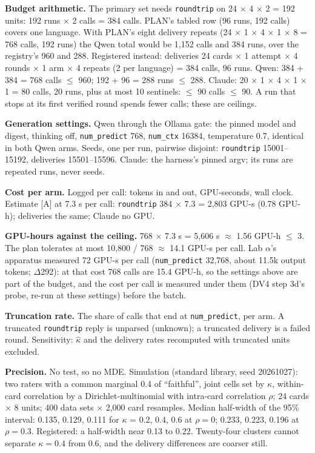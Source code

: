 \documentclass[11pt]{article}
\begin{document}
\begin{answer}
\textbf{Budget arithmetic.} The primary set needs \texttt{roundtrip} on 24
$\times$ 4 $\times$ 2 = 192 units: 192 runs $\times$ 2 calls = 384 calls.
PLAN's tabled row (96 runs, 192 calls) covers one language. With PLAN's eight
delivery repeats (24 $\times$ 1 $\times$ 4 $\times$ 1 $\times$ 8 = 768 calls,
192 runs) the Qwen total would be 1,152 calls and 384 runs, over the
registry's 960 and 288. Registered instead: deliveries 24 cards $\times$ 1
attempt $\times$ 4 rounds $\times$ 1 arm $\times$ 4 repeats (2 per language) =
384 calls, 96 runs. Qwen: 384 + 384 = 768 calls $\le$ 960; 192 + 96 = 288 runs
$\le$ 288. Claude: 20 $\times$ 1 $\times$ 4 $\times$ 1 $\times$ 1 = 80 calls,
20 runs, plus at most 10 sentinels: $\le$ 90 calls $\le$ 90. A run that stops at
its first verified round spends fewer calls; these are ceilings.

\textbf{Generation settings.} Qwen through the Ollama gate: the pinned model
and digest, thinking off, \texttt{num\_predict} 768, \texttt{num\_ctx} 16384,
temperature 0.7, identical in both Qwen arms. Seeds, one per run, pairwise
disjoint: \texttt{roundtrip} 15001--15192, deliveries 15501--15596. Claude:
the harness's pinned argv; its runs are repeated runs, never seeds.

\textbf{Cost per arm.} Logged per call: tokens in and out, GPU-seconds, wall
clock. Estimate [A] at 7.3 s per call: \texttt{roundtrip} 384 $\times$ 7.3 =
2,803 GPU-s (0.78 GPU-h); deliveries the same; Claude no GPU.

\textbf{GPU-hours against the ceiling.} 768 $\times$ 7.3 s = 5,606 s $\approx$
1.56 GPU-h $\le$ 3. The plan tolerates at most 10,800 / 768 $\approx$ 14.1
GPU-s per call. Lab $\alpha$'s apparatus measured 72 GPU-s per call
(\texttt{num\_predict} 32,768, about 11.5k output tokens; $\Delta$292): at that
cost 768 calls are 15.4 GPU-h, so the settings above are part of the budget,
and the cost per call is measured under them (DV4 step 3d's probe, re-run at
these settings) before the batch.

\textbf{Truncation rate.} The share of calls that end at \texttt{num\_predict},
per arm. A truncated \texttt{roundtrip} reply is unparsed (unknown); a
truncated delivery is a failed round. Sensitivity: $\hat\kappa$ and the
delivery rates recomputed with truncated units excluded.

\textbf{Precision.} No test, so no MDE. Simulation (standard library, seed
20261027): two raters with a common marginal 0.4 of ``faithful'', joint cells
set by $\kappa$, within-card correlation by a Dirichlet-multinomial with
intra-card correlation $\rho$; 24 cards $\times$ 8 units; 400 data sets
$\times$ 2,000 card resamples. Median half-width of the 95\% interval: 0.135,
0.129, 0.111 for $\kappa$ = 0.2, 0.4, 0.6 at $\rho=0$; 0.233, 0.223, 0.196 at
$\rho=0.3$. Registered: a half-width near 0.13 to 0.22. Twenty-four clusters
cannot separate $\kappa=0.4$ from 0.6, and the delivery differences are
coarser still.


\end{answer}
\end{document}

